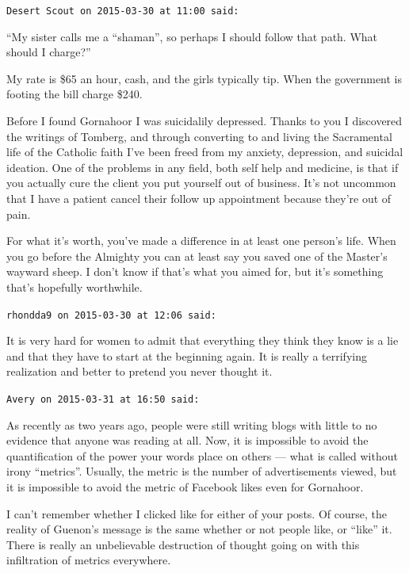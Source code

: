 \begin{footnotesize}
\begin{sffamily}
\hfill

\texttt{Desert Scout on 2015-03-30 at 11:00 said:}

``My sister calls me a ``shaman'', so perhaps I should follow that path. What should I charge?''

My rate is \$65 an hour, cash, and the girls typically tip. When the government is footing the bill charge \$240.

Before I found Gornahoor I was suicidalily depressed. Thanks to you I discovered the writings of Tomberg, and through converting to and living the Sacramental life of the Catholic faith I've been freed from my anxiety, depression, and suicidal ideation. One of the problems in any field, both self help and medicine, is that if you actually cure the client you put yourself out of business. It's not uncommon that I have a patient cancel their follow up appointment because they're out of pain.

For what it's worth, you've made a difference in at least one person's life. When you go before the Almighty you can at least say you saved one of the Master's wayward sheep. I don't know if that's what you aimed for, but it's something that's hopefully worthwhile.

\hfill

\texttt{rhondda9 on 2015-03-30 at 12:06 said:}

It is very hard for women to admit that everything they think they know is a lie and that they have to start at the beginning again. It is really a terrifying realization and better to pretend you never thought it.

\hfill

\texttt{Avery on 2015-03-31 at 16:50 said:}

As recently as two years ago, people were still writing blogs with little to no evidence that anyone was reading at all. Now, it is impossible to avoid the quantification of the power your words place on others --- what is called without irony ``metrics''. Usually, the metric is the number of advertisements viewed, but it is impossible to avoid the metric of Facebook likes even for Gornahoor.

I can't remember whether I clicked like for either of your posts. Of course, the reality of Guenon's message is the same whether or not people like, or ``like'' it. There is really an unbelievable destruction of thought going on with this infiltration of metrics everywhere.

\hfill


\end{sffamily}
\end{footnotesize}
